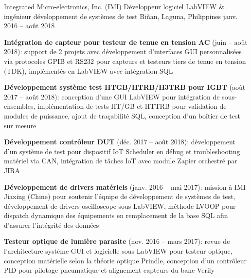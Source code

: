 \begin{cventries}
  \cventry
    {Integrated Micro-electronics, Inc. (IMI)}
    {D\'eveloppeur logiciel LabVIEW \& ing\'enieur d\'eveloppement de syst\`emes de test}
    {Bi\~nan, Laguna, Philippines}
    {janv. 2016 -- ao\^ut 2018}
    {
      \begin{cvitems}
        \item{\textbf{Int\'egration de capteur pour testeur de tenue en tension AC} (juin -- ao\^ut 2018): support de 2 projets avec d\'eveloppement d'interfaces GUI personnalis\'ees via protocoles GPIB et RS232 pour capteurs et testeurs tiers de tenue en tension (TDK), impl\'ement\'es en LabVIEW avec int\'egration SQL}
        \item{\textbf{D\'eveloppement syst\`eme test HTGB/HTRB/H3TRB pour IGBT} (ao\^ut 2017 -- ao\^ut 2018): conception d'une GUI LabVIEW pour int\'egration de sous-ensembles, impl\'ementation de tests HT/GB et HTTRB pour validation de modules de puissance, ajout de tra\c{c}abilit\'e SQL, conception d'un bo\^itier de test sur mesure}
        \item{\textbf{D\'eveloppement contr\^oleur DUT} (d\'ec. 2017 -- ao\^ut 2018): d\'eveloppement d'un syst\`eme de test pour dispositif IoT Scheduler en d\'ebug et troubleshooting mat\'eriel via CAN, int\'egration de t\^aches IoT avec module Zapier orchestr\'e par JIRA}
        \item{\textbf{D\'eveloppement de drivers mat\'eriels} (janv. 2016 -- mai 2017): mission \`a IMI Jiaxing (Chine) pour soutenir l'\'equipe de d\'eveloppement de syst\`emes de test, d\'eveloppement de drivers oscilloscope sous LabVIEW, m\'ethode LVOOP pour dispatch dynamique des \'equipements en remplacement de la base SQL afin d'assurer l'int\'egrit\'e des donn\'ees}
        \item{\textbf{Testeur optique de lumi\`ere parasite} (nov. 2016 -- mars 2017): revue de l'architecture syst\`eme GUI et logicielle sous LabVIEW pour testeur optique, conception mat\'erielle selon la th\'eorie optique Prindle, conception d'un contr\^oleur PID pour pilotage pneumatique et alignement capteurs du banc Verily}
      \end{cvitems}
      \vspace{1em}
    }

\end{cventries}
